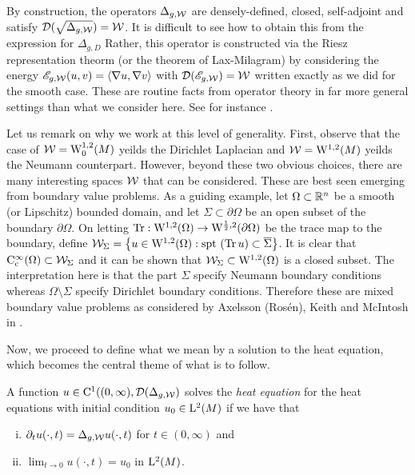 \documentclass[a4paper, 12pt]{amsart}
\begin{document}
By construction, the  operators $\Delta_{g,\cW}$ 
are densely-defined, closed, self-adjoint and satisfy 
$\dom(\sqrt{\Delta_{g,\cW}}) = \cW$.
It is difficult to see how to obtain this from the expression for $\Delta_{g,D}$
Rather, this operator is constructed via the Riesz representation
theorm (or the theorem of Lax-Milagram) by considering the
energy $\sE_{g,\cW}(u,v) = \inprod{\nabla u, \nabla v}$ 
with $\dom(\sE_{g,\cW}) = \cW$ written exactly as we did for the smooth case.
These are routine facts from operator theory in far more general 
settings than what we consider here. See for instance 
\cite{Yosida, Kato}.

Let us remark on why we work at this level 
of generality. First, observe that the case of $\cW = \SobH[0]{1}(M)$
yeilds the Dirichlet Laplacian
and $\cW = \SobH{1}(M)$ yeilds the Neumann counterpart.
However, beyond these two obvious choices, 
there are many interesting spaces $\cW$ that
can be considered. These are best
seen emerging from boundary value problems.
As a guiding example, let $\Omega \subset \R^n$
be a smooth (or Lipschitz) bounded domain, and let $\Sigma \subset \partial \Omega$
be an open subset of the boundary $\partial \Omega$.
On letting $\Tr: \SobH{1}(\Omega) \to \SobH{\frac{1}{2}}(\partial \Omega)$
be the trace map to the boundary, define 
$\cW_{\Sigma} = \set{u \in \SobH{1}(\Omega): \spt (\Tr u) \subset \close{\Sigma}}$. 
It is clear that $\Ck[c]{\infty}(\Omega) \subset \cW_{\Sigma}$ and
it can be shown that $\cW_{\Sigma} \subset \SobH{1}(\Omega)$
is a closed subset. 
The interpretation here is that the part $\Sigma$ 
specify Neumann boundary conditions whereas $\Omega \setminus \Sigma$
specify Dirichlet boundary conditions. Therefore
these are mixed boundary value problems as considered
by  Axelsson (Rosén), Keith and McIntosh in \cite{AKM2}.

Now, we proceed to define what we mean by a solution to the heat
equation, which becomes the central theme of what is to follow.

\begin{defn}
A function \(u \in \Ck{1}((0,\infty),  \dom(\Delta_{g,\cW})\) solves the \emph{heat equation} for 
the heat equations
with initial condition $u_0 \in \Lp{2}(M)$  if we have that
\begin{enumerate}[(i)]
\item  $\partial_t u (\cdot, t) = \Delta_{g,\cW} u(\cdot, t)$ for $t \in (0, \infty)$ and 
\item $\lim_{t \to 0} u(\cdot, t) = u_0$ in $\Lp{2}(M)$.
\end{enumerate}
\end{defn}
\end{document}

